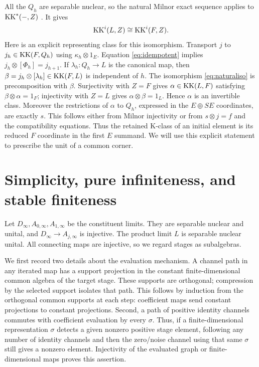 \documentclass[11pt,letterpaper]{amsart}
\theoremstyle{remark}\newtheorem{remark}[theorem]{Remark}
\begin{document}
All the $Q_h$ are separable nuclear, so the natural Milnor exact
sequence applies to $\operatorname{KK}^*(-,Z)$
\cite[Theorems 1.12 and 1.14(b)]{RS}. It gives
\begin{equation}\label{eq:naturaliso}
                        \operatorname{KK}^i(L,Z)\cong\operatorname{KK}^i(F,Z).
\end{equation}
Here is an explicit representing class for this isomorphism. Transport
$j$ to $j_h\in\operatorname{KK}(F,Q_h)$ using $\kappa_h\otimes1_E$.
Equation \eqref{eq:idempotent} implies
$j_h\otimes[\Phi_h]=j_{h+1}$. If $\lambda_h:Q_h\to L$ is the canonical
map, then $\beta=j_h\otimes[\lambda_h]\in\operatorname{KK}(F,L)$ is independent of $h$.
The isomorphism \eqref{eq:naturaliso} is precomposition with $\beta$.
Surjectivity with $Z=F$ gives $\alpha\in\operatorname{KK}(L,F)$ satisfying
$\beta\otimes\alpha=1_F$; injectivity with $Z=L$ gives
$\alpha\otimes\beta=1_L$. Hence $\alpha$ is an invertible class.
Moreover the restrictions of $\alpha$ to $Q_h$, expressed in the
$E\oplus SE$ coordinates, are exactly $s$. This follows either from
Milnor injectivity or from $s\otimes j=f$ and the compatibility equations.
Thus the retained K-class of an initial element is its reduced $F$
coordinate in the first $E$ summand. We will use this explicit statement
to prescribe the unit of a common corner.

\section{Simplicity, pure infiniteness, and stable finiteness}
Let $D_\infty,A_{0,\infty},A_{1,\infty}$ be the constituent limits.
They are separable nuclear and unital, and $D_\infty\to A_{j,\infty}$
is injective. The product limit $L$ is separable nuclear unital.
All connecting maps are injective, so we regard stages as subalgebras.

We first record two details about the evaluation mechanism. A channel
path in any iterated map has a support projection in the constant
finite-dimensional common algebra of the target stage. These supports
are orthogonal; compression by the selected support isolates that path.
This follows by induction from the orthogonal common supports at each
step: coefficient maps send constant projections to constant projections.
Second, a path of positive identity channels commutes with coefficient
evaluation by every $\sigma$. Thus, if a finite-dimensional representation
$\sigma$ detects a given nonzero positive stage element, following any
number of identity channels and then the zero/noise channel using that
same $\sigma$ still gives a nonzero element. Injectivity of the evaluated
graph or finite-dimensional maps proves this assertion.
\end{document}
